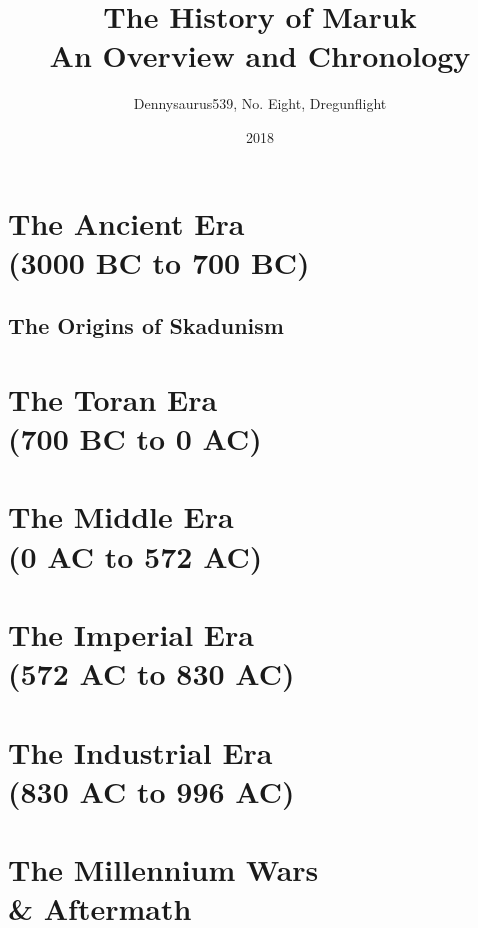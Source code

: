 \documentclass[a5paper, 11pt, openright, twoside]{book}
\title{The History of Maruk\\\large{An Overview and Chronology}}
\date{2018}
\author{Dennysaurus539, No. Eight, Dregunflight}
\begin{document}
	
	
	\part{The Ancient Era\\ (3000 BC to 700 BC)}
		\chapter{The Origins of Skadunism}
		
	\part{The Toran Era\\ (700 BC to 0 AC)}
		
	\part{The Middle Era\\ (0 AC to 572 AC)}
		
		
	\part{The Imperial Era\\ (572 AC to 830 AC)}
		
	\part{The Industrial Era\\ (830 AC to 996 AC)}
		
	\part{The Millennium Wars\\ \& Aftermath} 
	\printindex
\end{document}
